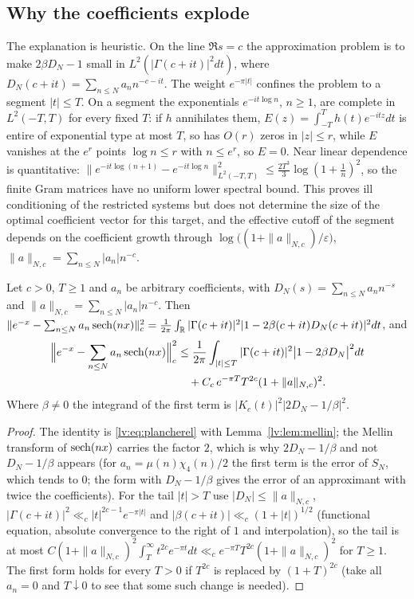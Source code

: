 \subsection{Why the coefficients explode}

The explanation is heuristic. On the line $\Re s=c$ the approximation problem is to make $2\beta D_N-1$ small in $L^2(|\Gamma(c+it)|^2dt)$, where $D_N(c+it)=\sum_{n\le N}a_nn^{-c-it}$. The weight $e^{-\pi|t|}$ confines the problem to a segment $|t|\le T$. On a segment the exponentials $e^{-it\log n}$, $n\ge1$, are complete in $L^2(-T,T)$ for every fixed $T$: if $h$ annihilates them, $E(z)=\int_{-T}^Th(t)e^{-itz}dt$ is entire of exponential type at most $T$, so has $O(r)$ zeros in $|z|\le r$, while $E$ vanishes at the $e^r$ points $\log n\le r$ with $n\le e^r$, so $E=0$. Near linear dependence is quantitative: $\|e^{-it\log(n+1)}-e^{-it\log n}\|_{L^2(-T,T)}^2\le\frac{2T^3}3\log(1+\frac1n)^2$, so the finite Gram matrices have no uniform lower spectral bound. This proves ill conditioning of the restricted systems but does not determine the size of the optimal coefficient vector for this target, and the effective cutoff of the segment depends on the coefficient growth through $\log\bigl((1+\|a\|_{N,c})/\varepsilon\bigr)$, $\|a\|_{N,c}=\sum_{n\le N}|a_n|n^{-c}$.

\begin{proposition}\label{lv:prop:segment}
Let $c>0$, $T\ge1$ and $a_n$ be arbitrary coefficients, with $D_N(s)=\sum_{n\le N}a_nn^{-s}$ and $\|a\|_{N,c}=\sum_{n\le N}|a_n|n^{-c}$. Then $\|e^{-x}-\sum_{n\le N}a_n\operatorname{sech}(nx)\|_c^2=\frac1{2\pi}\int_{\mathbb{R}}|\Gamma(c+it)|^2|1-2\beta(c+it)D_N(c+it)|^2dt$, and
\[
\begin{aligned}\Bigl\|e^{-x}-\sum_{n\le N}a_n\operatorname{sech}(nx)\Bigr\|_c^2&\le\frac1{2\pi}\int_{|t|\le T}|\Gamma(c+it)|^2\bigl|1-2\beta D_N\bigr|^2dt\\&\quad+C_c\,e^{-\pi T}T^{2c}(1+\|a\|_{N,c})^2 .\end{aligned}
\]
Where $\beta\ne0$ the integrand of the first term is $|K_c(t)|^2|2D_N-1/\beta|^2$.
\end{proposition}

\begin{proof}
The identity is \eqref{lv:eq:plancherel} with Lemma~\ref{lv:lem:mellin}; the Mellin transform of $\operatorname{sech}(nx)$ carries the factor $2$, which is why $2D_N-1/\beta$ and not $D_N-1/\beta$ appears (for $a_n=\mu(n)\chi_4(n)/2$ the first term is the error of $S_N$, which tends to $0$; the form with $D_N-1/\beta$ gives the error of an approximant with twice the coefficients). For the tail $|t|>T$ use $|D_N|\le \|a\|_{N,c}$, $|\Gamma(c+it)|^2\ll_c|t|^{2c-1}e^{-\pi|t|}$ and $|\beta(c+it)|\ll_c(1+|t|)^{1/2}$ (functional equation, absolute convergence to the right of $1$ and interpolation), so the tail is at most $C(1+\|a\|_{N,c})^2\int_T^\infty t^{2c}e^{-\pi t}dt\ll_ce^{-\pi T}T^{2c}(1+\|a\|_{N,c})^2$ for $T\ge1$. The first form holds for every $T>0$ if $T^{2c}$ is replaced by $(1+T)^{2c}$ (take all $a_n=0$ and $T\downarrow0$ to see that some such change is needed).
\end{proof}

